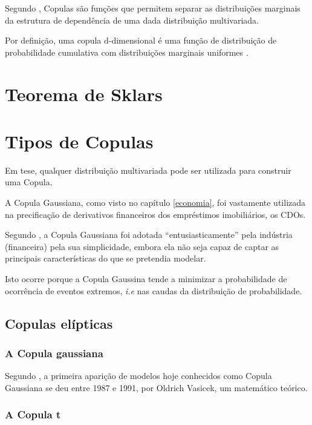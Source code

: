 \documentclass[
	12pt,				%
	oneside,			%
	a4paper,			%
	chapter=TITLE,		%
	section=TITLE,		%
	english,			%
	brazil				%
	]{abntex2}
\begin{document}
Segundo \textcite{copulas}, Copulas são funções que permitem separar as distribuições
marginais da estrutura de dependência de uma dada distribuição multivariada.

Por definição, uma copula d-dimensional é uma função de distribuição de
probabilidade cumulativa com distribuições marginais uniformes \autocite[1]{copulas}.

\hypertarget{teorema-de-sklars}{%
\section{Teorema de Sklars}\label{teorema-de-sklars}}

\hypertarget{tipos-de-copulas}{%
\section{Tipos de Copulas}\label{tipos-de-copulas}}

Em tese, qualquer distribuição multivariada pode ser utilizada para construir
uma Copula.

A Copula Gaussiana, como visto no capítulo \ref{economia}, foi vastamente
utilizada na precificação de derivativos financeiros dos empréstimos
imobiliários, os \gls{CDO}s.

Segundo \textcite{devil}, a Copula Gaussiana foi adotada ``entusiasticamente'' pela
indústria (financeira) pela sua simplicidade, embora ela não seja capaz de
captar as principais características do que se pretendia modelar.

Isto ocorre porque a Copula Gaussina tende a minimizar a probabilidade de
ocorrência de eventos extremos, \emph{i.e} nas caudas da distribuição de
probabilidade.

\hypertarget{copulas-eluxedpticas}{%
\subsection{Copulas elípticas}\label{copulas-eluxedpticas}}

\hypertarget{a-copula-gaussiana}{%
\subsubsection{A Copula gaussiana}\label{a-copula-gaussiana}}

Segundo \textcite{formula}, a primeira aparição de modelos hoje conhecidos como Copula
Gaussiana se deu entre 1987 e 1991, por Oldrich Vasicek, um matemático teórico.

\hypertarget{a-copula-t}{%
\subsubsection{A Copula t}\label{a-copula-t}}
\end{document}
